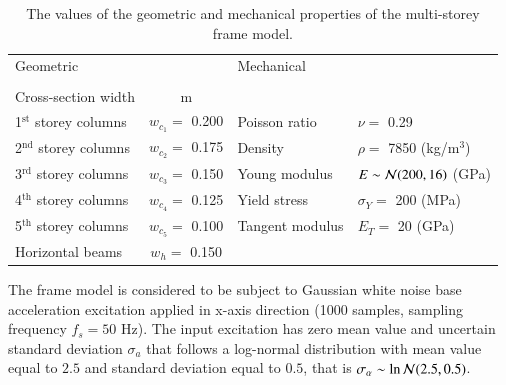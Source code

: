 \documentclass[preprint,3p,review,times,11pt]{elsarticle}
\begin{document}
\begin{table} 
\centering
\caption{The values of the geometric and mechanical properties of the multi-storey frame model.}\label{tab:con_prop}
\begin{tabular}{lcll}\hline
\multicolumn{2}{l}{Geometric}& \multicolumn{2}{l}{Mechanical}\\[-6pt]
\multicolumn{2}{l}{\hrulefill}& & \\
Cross-section width & \hspace{-0.2cm} m & & \\\hline
1$^{\text{st}}$ storey columns & \hspace{-0.2cm} $w_{c_1} =$ 0.200  & Poisson ratio & \hspace{-0.2cm} $\nu=$ 0.29 \\
2$^{\text{nd}}$ storey columns & \hspace{-0.2cm} $w_{c_2} =$ 0.175  & Density & \hspace{-0.2cm} $ \rho =$ 7850 (kg/m$^3$)\\
3$^{\text{rd}}$ storey columns & \hspace{-0.2cm} $w_{c_3} =$ 0.150  & Young modulus & \hspace{-0.2cm} $ E \sim {\cal N}(200,16) $ (GPa) \\
4$^{\text{th}}$ storey columns & \hspace{-0.2cm} $w_{c_4} =$ 0.125  & Yield stress & \hspace{-0.2cm} $ \sigma_Y = $ 200 (MPa)\\
5$^{\text{th}}$ storey columns & \hspace{-0.2cm} $w_{c_5} =$ 0.100  & Tangent modulus & \hspace{-0.2cm} $ E_T = $ 20 (GPa) \\
Horizontal beams & \hspace{-0.2cm} $w_{h}=$ 0.150 & & \\\hline
\end{tabular}
\end{table}

The frame model is considered to be subject to Gaussian white noise base acceleration excitation applied in x-axis direction (1000 samples, sampling frequency $f_s = 50$ Hz). The input excitation has zero mean value and uncertain standard deviation $\sigma_a$ that follows a log-normal distribution with mean value equal to $2.5$ and standard deviation equal to $0.5$, that is $\sigma_\alpha \sim \ln {\cal N} (2.5,0.5)$.
\end{document}
